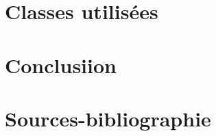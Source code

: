 \documentclass[12pt]{article}
\begin{document}
\section{Classes utilisées}

\section{Conclusiion}


\section{Sources-bibliographie}
\cite{dibbelt2017connection} 
\cite{epfl2024cs108}
\cite{transnetlabCSA}
\cite{gtfsReference}
\cite{futura2009distance}
\cite{geeko2018distance}
\cite{geeksforgeeks_haversine}
\cite{wikipedia_geohash}
\cite{mattaparthi2024ballkd}
\cite{fieldsend_onlineballtree}
\cite{woltmann2025astar}
\cite{wikipedia_astar}
\cite{geeksforgeeks_astar}
\cite{wikipedia_dijkstra}
\cite{baeldung_collections_sort}
\cite{wikipedia_timsort}
\cite{linkGTFSCSA}
\cite{dijkstra1959note}
\cite{astart2021literature}

\printbibliography
\end{document}
